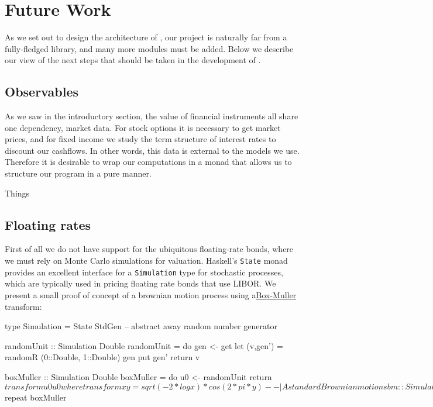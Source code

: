 \chapter{Future Work}

As we set out to design the architecture of \hql, our project is naturally far 
from a fully-fledged library, and many more modules must be added. Below we
describe our view of the next steps that should be taken in the development
of \hql.

\section{Observables}

As we saw in the introductory section, the value of financial instruments
all share one dependency, market data. For stock options it is necessary 
to get market prices, and for fixed income we study the term structure of
interest rates to discount our cashflows. In other words, this data is 
external to the models we use.\\

Therefore it is desirable to wrap our computations in a monad that allows us
to structure our program in a pure manner.

\begin{hscode}
Things
\end{hscode}

\section{Floating rates}

First of all we do not have support for the ubiquitous floating-rate bonds, 
where we must rely on Monte Carlo simulations for valuation. Haskell's 
\texttt{State} monad provides an excellent interface for a \texttt{Simulation}
type for stochastic processes, which are typically used in pricing floating
rate bonds that use LIBOR. We present a small proof of concept of a brownian
motion process using a\href{http://en.wikipedia.org/wiki/Box%E2%80%93Muller_transform}{Box-Muller} transform:


\begin{hscode}
type Simulation = State StdGen -- abstract away random number generator

randomUnit :: Simulation Double
randomUnit = do
               gen <- get
               let (v,gen') = randomR (0::Double, 1::Double) gen
               put gen'
               return v

boxMuller :: Simulation Double
boxMuller = do
  u0 <- randomUnit
  return $ transform u0 u0
  where transform x y = sqrt(-2*log x)*cos(2*pi*y)

-- | A standard Brownian motion
sbm :: Simulation [Double]
sbm = sequence $ repeat boxMuller
\end{hscode}

